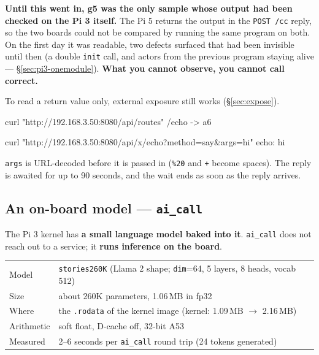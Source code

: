 \documentclass[11pt,a4paper]{article}
\begin{document}
\textbf{Until this went in, g5 was the only sample whose output had been checked
on the Pi 3 itself.} The Pi 5 returns the output in the \texttt{POST /cc} reply,
so the two boards could not be compared by running the same program on both.
On the first day it was readable, two defects surfaced that had been invisible
until then (a double \texttt{init} call, and actors from the previous program
staying alive --- \S\ref{sec:pi3-onemodule}).
\textbf{What you cannot observe, you cannot call correct.}

To read a return value only, external exposure still works (\S\ref{sec:expose}).



\begin{term}
curl "http://192.168.3.50:8080/api/routes"
/echo -> a6

curl "http://192.168.3.50:8080/api/x/echo?method=say&args=hi"
echo: hi
\end{term}

\texttt{args} is URL-decoded before it is passed in (\texttt{\%20} and
\texttt{+} become spaces). The reply is awaited for up to 90 seconds, and the
wait ends as soon as the reply arrives.

\subsection{An on-board model --- \texttt{ai\_call}}
\label{sec:xinu-ai}

The Pi 3 kernel has \textbf{a small language model baked into it}.
\texttt{ai\_call} does not reach out to a service; it \textbf{runs inference on
the board}.

\begin{center}
\small
\begin{tabular}{@{}ll@{}}
\toprule
Model & \texttt{stories260K} (Llama 2 shape; \texttt{dim}=64, 5 layers, 8 heads, vocab 512) \\
Size & about 260K parameters, 1.06\,MB in fp32 \\
Where & the \texttt{.rodata} of the kernel image (kernel: 1.09\,MB $\to$ 2.16\,MB) \\
Arithmetic & soft float, D-cache off, 32-bit A53 \\
Measured & 2--6 seconds per \texttt{ai\_call} round trip (24 tokens generated) \\
\bottomrule
\end{tabular}
\end{center}
\end{document}

